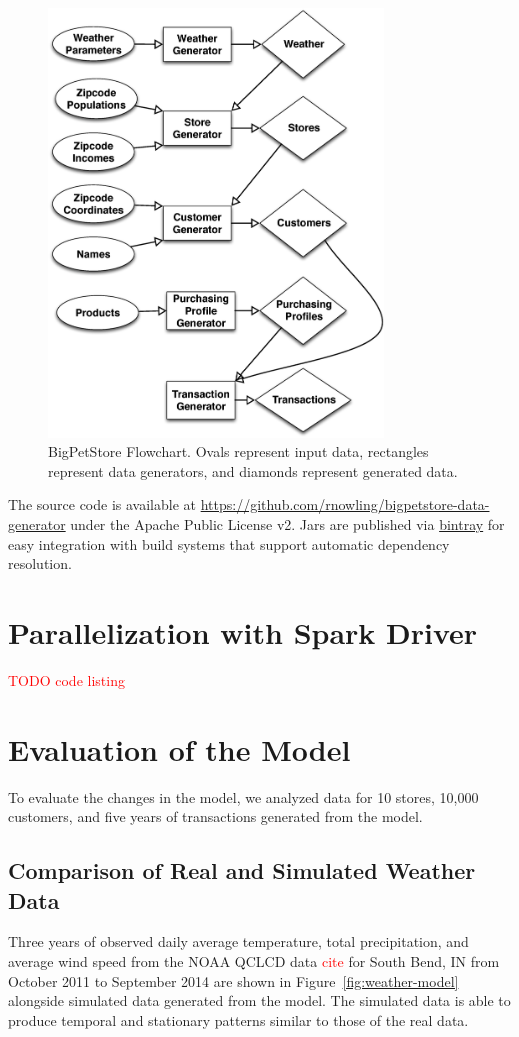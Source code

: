 \documentclass[conference]{IEEEtran}
\begin{document}
\begin{figure}[!t]
  \centering
  \includegraphics[width=3.5in]{figures/bps_flowchart.eps}
  \caption{BigPetStore Flowchart. Ovals represent input data, rectangles represent data generators, and diamonds represent generated data.}
  \label{fig:bps_flowchart}
\end{figure}

The source code is available at \url{https://github.com/rnowling/bigpetstore-data-generator} under the Apache Public License v2. Jars are published via \textcolor{red}{\url{bintray}} for easy integration with build systems that support automatic dependency resolution.  

\section{Parallelization with Spark Driver} \label{sec:spark}
\textcolor{red}{TODO code listing}

\section{Evaluation of the Model}
To evaluate the changes in the model, we analyzed data for 10 stores, 10,000 customers, and five years of transactions generated from the model. 

\subsection{Comparison of Real and Simulated Weather Data}
Three years of observed daily average temperature, total precipitation, and average wind speed from the NOAA QCLCD data \textcolor{red}{cite} for South Bend, IN from October 2011 to September 2014 are shown in Figure~\ref{fig:weather-model} alongside simulated data generated from the model. The simulated data is able to produce temporal and stationary patterns similar to those of the real data.
\end{document}

